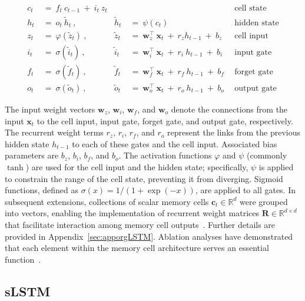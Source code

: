 \begin{align}
c_t \ &= \  f_t \ c_{t-1} \ + \ i_t \ z_t &  & &\text{cell state} \\
h_t  \ &= \ o_t \ \tilde{h}_t \ , & \tilde{h}_t \ &= \ \psi \left( c_t\right)
  &\text{hidden state} \\
z_t \ &= \ \varphi \left( \tilde{z}_t \right) \ , 
  &\tilde{z}_t \ &=  \ \mathbf{w}^\top_{z} \ \mathbf{x}_t \ + \
  r_{z}  h_{t-1} \ + \  b_{z} \ \
  &\text{cell input} \\
i_t \ &= \ \sigma \left( \tilde{i}_t  \right) \ , 
  &\tilde{i}_t \ &= \ \mathbf{w}^\top_{i} \ \mathbf{x}_t \ + \
  r_{i}  \ h_{t-1} \ + \  b_{i} \ \
  &\text{input gate} \\
f_t \ &= \ \sigma \left(  \tilde{f}_t \right) \ , 
  &\tilde{f}_t \ &= \ \mathbf{w}^\top_{f} \ \mathbf{x}_t  \ + \
  r_{f}  \ h_{t-1} \ + \  b_{f} \ \
  &\text{forget gate} \\
o_t \ &= \ \sigma \left( \tilde{o}_t \right) \ , 
  &\tilde{o}_t  \ &= \ \mathbf{w}^\top_{o} \ \mathbf{x}_t \ + \
  r_{o}  \ h_{t-1} \ + \  b_{o} \ \
  &\text{output gate} 
\end{align}

The input weight vectors $\mathbf{w}_{z}$, $\mathbf{w}_{i}$, $\mathbf{w}_{f}$, and $\mathbf{w}_{o}$ denote the connections from the input $\mathbf{x}_t$ to the cell input, input gate, forget gate, and output gate, respectively. The recurrent weight terms $r_{z}$, $r_{i}$, $r_{f}$, and $r_{o}$ represent the links from the previous hidden state $h_{t-1}$ to each of these gates and the cell input. Associated bias parameters are $b_{z}$, $b_{i}$, $b_{f}$, and $b_{o}$. The activation functions $\varphi$ and $\psi$ (commonly $\tanh$) are used for the cell input and the hidden state; specifically, $\psi$ is applied to constrain the range of the cell state, preventing it from diverging. Sigmoid functions, defined as $\sigma \left( x \right)= 1/(1+\exp(-x))$, are applied to all gates. In subsequent extensions, collections of scalar memory cells $\mathbf{c}_t \in \mathbb{R}^{d}$ were grouped into vectors, enabling the implementation of recurrent weight matrices $\mathbf{R} \in \mathbb{R}^{d \times d}$ that facilitate interaction among memory cell outputs~\citep{Greff:15}. Further details are provided in Appendix~\ref{sec:apporgLSTM}. Ablation analyses have demonstrated that each element within the memory cell architecture serves an essential function~\citep{Greff:15}.

\subsection{sLSTM}
\label{sec:sLSTM}

